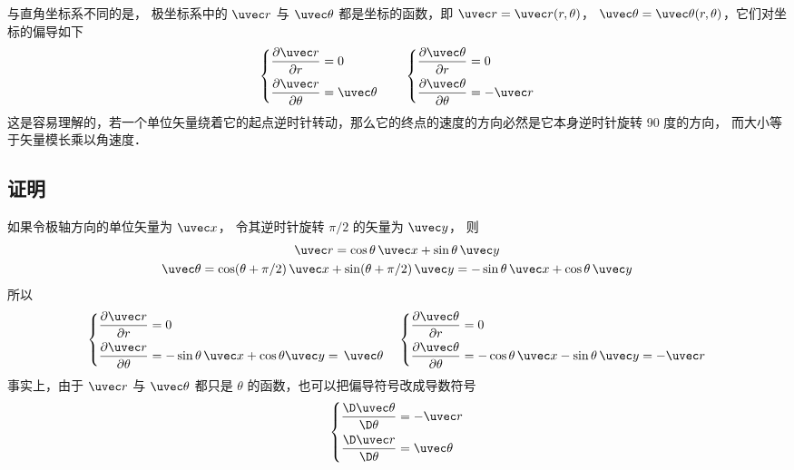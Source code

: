 

与直角坐标系不同的是， 极坐标系中的 $\uvec r$ 与 $\uvec \theta $ 都是坐标的函数，即 $\uvec r = \uvec r (r,\theta)$， $\uvec \theta  = \uvec \theta (r,\theta)$，它们对坐标的偏导如下
\begin{equation}\label{Dpol1_eq1}
\left\{ \begin{aligned}
\frac{{\partial \uvec r}}{{\partial r}} &= 0\\
\frac{{\partial \uvec r}}{{\partial \theta }} &= \uvec \theta 
\end{aligned} \right.
\qquad
\left\{ \begin{aligned}
\frac{{\partial \uvec \theta }}{{\partial r}} &= 0\\
\frac{{\partial \uvec \theta }}{{\partial \theta }} &=  - \uvec r
\end{aligned} \right.
\end{equation}
这是容易理解的，若一个单位矢量绕着它的起点逆时针转动，那么它的终点的速度的方向必然是它本身逆时针旋转 90 度的方向， 而大小等于矢量模长乘以角速度．
\subsection{证明}
如果令极轴方向的单位矢量为 $\uvec x$， 令其逆时针旋转 $\pi/2$ 的矢量为 $\uvec y$， 则
\begin{gather}
\uvec r = \cos \theta \,\uvec x + \sin \theta \,\uvec y\\
\uvec \theta  = \cos (\theta +\pi/2)\,\uvec x + \sin (\theta +\pi/2)\,\uvec y
=  - \sin \theta \,\uvec x + \cos \theta \,\uvec y
\end{gather} 
所以
\begin{equation}
\left\{ \begin{aligned}
\frac{{\partial \uvec r}}{{\partial r}} &= 0\\
\frac{{\partial \uvec r}}{{\partial \theta }} &=  - \sin \theta \,\uvec x + \cos \theta \uvec y = \,\uvec \theta 
\end{aligned} \right.
\quad
\left\{ \begin{aligned}
\frac{{\partial \uvec \theta }}{{\partial r}} &= 0\\
\frac{{\partial \uvec \theta }}{{\partial \theta }} &=  - \cos \theta \,\uvec x - \sin \theta \,\uvec y =  - \uvec r
\end{aligned} \right.
\end{equation}  
事实上，由于 $\uvec r$ 与 $\uvec \theta $ 都只是 $\theta$ 的函数，也可以把偏导符号改成导数符号
 \begin{equation}
\left\{ \begin{aligned}
\frac{{\D \uvec \theta }}{{\D \theta }} &=  - \uvec r\\
\frac{{\D \uvec r}}{{\D \theta }} &= \uvec \theta 
\end{aligned} \right.
\end{equation}
 
 
 
 
 
 
 
 
 
 
 
 
 
 
 
 
 
 
 
 
 
 
 
 
 
 